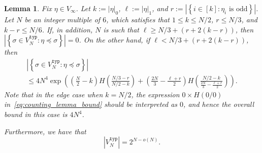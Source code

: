 \documentclass[11pt]{article}
\numberwithin{equation}{section}
\newtheorem{lemma}[theorem]{Lemma}
\theoremstyle{definition}
\begin{document}
\begin{lemma}\label{lem:descendant_count_in_VN_discrete}
Fix $\eta \in V_{\infty}$. 
Let $k := |\eta|_{0}$, 
$\ell := |\eta|_{1}$, 
and 
$r := \left| \left\{ i \in [k] : \eta_{i} \text{ is odd} \right\} \right|$. 
Let $N$ be an integer multiple of $6$, 
which satisfies that
$1 \leq k \leq N/2$, 
$r \leq N/3$, 
and $k-r \leq N/6$. 
If, in addition, $N$ is such that
$\ell \geq N/3 + (r + 2(k-r))$, 
then 
$\left| \left\{ \sigma \in V_{N}^{\mathtt{typ}} : \eta \preccurlyeq \sigma \right\} \right| = 0$.
On the other hand, if $\ell < N/3 + (r + 2(k-r))$, 
then 
\begin{multline}\label{eq:counting_lemma_bound}
\left| \left\{ \sigma \in V_{N}^{\mathtt{typ}} : \eta \preccurlyeq \sigma \right\} \right| \\
\leq 
4 N^{4} \exp \left( \left( \frac{N}{2} - k \right) H \left( \frac{N/3-r}{N/2-k} \right) 
+ \left( \frac{2N}{3}  -  \frac{\ell + r}{2}  \right) H \left( \frac{N/2 - k}{\frac{2N}{3} -  \frac{\ell + r}{2}} \right)  \right).
\end{multline}
Note that in the edge case when $k = N/2$, 
the expression $0 \times H(0/0)$ in~\eqref{eq:counting_lemma_bound} should be interpreted as $0$, and hence the overall bound in this case is $4N^{4}$.


Furthermore, we have that 
\begin{equation}\label{eq:VNtyp_size}
\left| V_{N}^{\mathtt{typ}} \right| = 2^{N-o(N)}. 
\end{equation}
\end{lemma}
\end{document}
